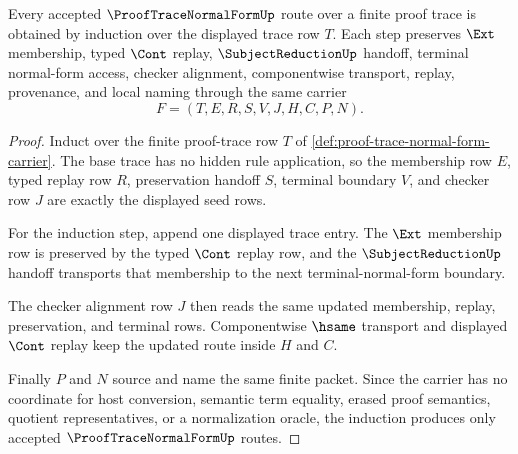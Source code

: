 \begin{theorem}
\label{thm:proof-trace-normal-form-finite-candidate-induction}
Every accepted $\ProofTraceNormalFormUp$ route over a finite proof trace is obtained by induction over the displayed trace row $T$. Each step preserves $\Ext$ membership, typed $\Cont$ replay, $\SubjectReductionUp$ handoff, terminal normal-form access, checker alignment, componentwise transport, replay, provenance, and local naming through the same carrier
$$
F=(T,E,R,S,V,J,H,C,P,N).
$$
\end{theorem}
\begin{proof}
Induct over the finite proof-trace row $T$ of \autoref{def:proof-trace-normal-form-carrier}. The base trace has no hidden rule application, so the membership row $E$, typed replay row $R$, preservation handoff $S$, terminal boundary $V$, and checker row $J$ are exactly the displayed seed rows.

For the induction step, append one displayed trace entry. The $\Ext$ membership row is preserved by the typed $\Cont$ replay row, and the $\SubjectReductionUp$ handoff transports that membership to the next terminal-normal-form boundary.

The checker alignment row $J$ then reads the same updated membership, replay, preservation, and terminal rows. Componentwise $\hsame$ transport and displayed $\Cont$ replay keep the updated route inside $H$ and $C$.

Finally $P$ and $N$ source and name the same finite packet. Since the carrier has no coordinate for host conversion, semantic term equality, erased proof semantics, quotient representatives, or a normalization oracle, the induction produces only accepted $\ProofTraceNormalFormUp$ routes.
\end{proof}




